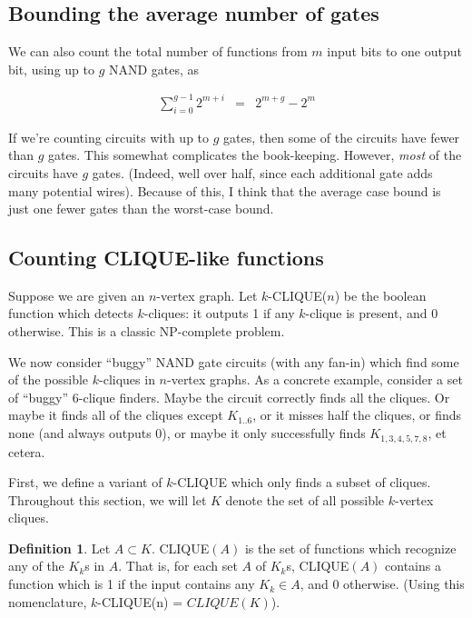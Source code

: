 \documentclass[12pt]{article}
\theoremstyle{definition}
\newtheorem{defn}{Definition}[section]
\begin{document}
\subsection{Bounding the average number of gates}

We can also count the total number of functions from $m$ input bits to one
output bit, using up to $g$ NAND gates, as

\begin{eqnarray*}
\sum_{i=0}^{g-1} 2^{m+i} & = & 2^{m+g} - 2^m
\end{eqnarray*}

If we're counting circuits with up to $g$ gates, then some of the circuits
have fewer than $g$ gates. This somewhat complicates the book-keeping.
However, {\em most} of the
circuits have $g$ gates. (Indeed, well over half, since each additional
gate adds many potential wires). Because of this, I think that the
average case bound is just one fewer gates than the worst-case bound.

\subsection{Counting CLIQUE-like functions}

Suppose we are given an $n$-vertex graph.
Let $k$-CLIQUE($n$) be the boolean function which
detects $k$-cliques: it outputs 1 if any $k$-clique
is present, and 0 otherwise. This is a classic
NP-complete problem.

We now consider ``buggy'' NAND gate circuits (with any fan-in) which find some of the possible $k$-cliques in $n$-vertex
graphs.
As a concrete example,
consider a set of ``buggy'' 6-clique finders. 
Maybe the circuit correctly
finds all the cliques. Or maybe it finds all of the cliques except $K_{1..6}$,
or it misses half the cliques, or finds none (and always outputs 0), or maybe
it only successfully finds $K_{1,3,4,5,7,8}$, et cetera.

First, we define a variant of $k$-CLIQUE which only
finds a subset of cliques. Throughout this section,
we will let $K$ denote the set of all possible
$k$-vertex cliques.

\begin{defn}
\label{CLIQUE}
Let $A \subset K$.
CLIQUE$(A)$ is the set of functions which recognize any of the $K_k$s in $A$. That is, for each set $A$ of $K_k$s, CLIQUE$(A)$
contains a function which is 1 if the input contains any $K_k \in A$,
and 0 otherwise. (Using this nomenclature,
$k$-CLIQUE(n) = $CLIQUE(K)$).
\end{defn}
\end{document}
